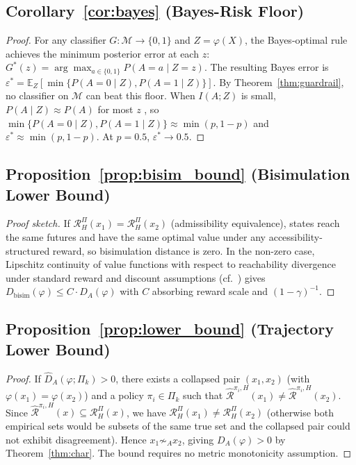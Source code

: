 \documentclass[10pt,twocolumn]{article}
\theoremstyle{plain}
\theoremstyle{definition}
\theoremstyle{remark}
\newcommand{\simA}{\sim_{\!A}}
\newcommand{\RHP}{\mathcal{R}_{H}^{\Pi}}
\newcommand{\DA}{D_{A}(\varphi)}
\newcommand{\calM}{\mathcal{M}}
\begin{document}
\subsection*{Corollary~\ref{cor:bayes} (Bayes-Risk Floor)}

\begin{proof}
For any classifier $G:\calM\to\{0,1\}$ and $Z=\varphi(X)$, the Bayes-optimal
rule achieves the minimum posterior error at each $z$:
$G^*(z)=\arg\max_{a\in\{0,1\}}P(A=a\mid Z=z)$.
The resulting Bayes error is
$\varepsilon^*=\mathbb{E}_Z[\min\{P(A=0\mid Z),P(A=1\mid Z)\}]$.
By Theorem~\ref{thm:guardrail}, no classifier on $\calM$ can beat this floor.
When $I(A;Z)$ is small, $P(A\mid Z)\approx P(A)$ for most $z$
\citep{cover2006elements}, so $\min\{P(A=0\mid Z),P(A=1\mid Z)\}\approx\min(p,1-p)$
and $\varepsilon^*\approx\min(p,1-p)$. At $p=0.5$, $\varepsilon^*\to 0.5$.
\end{proof}

\subsection*{Proposition~\ref{prop:bisim_bound} (Bisimulation Lower Bound)}

\begin{proof}[Proof sketch]
If $\RHP(x_1)=\RHP(x_2)$ (admissibility equivalence), states reach the same
futures and have the same optimal value under any accessibility-structured reward,
so bisimulation distance is zero. In the non-zero case, Lipschitz continuity of
value functions with respect to reachability divergence under standard reward and
discount assumptions (cf.\ \citet{ferns2004metrics}) gives
$D_{\mathrm{bisim}}(\varphi)\leq C\cdot\DA$ with $C$ absorbing reward scale
and $(1-\gamma)^{-1}$.
\end{proof}

\subsection*{Proposition~\ref{prop:lower_bound} (Trajectory Lower Bound)}

\begin{proof}
If $\hat{D}_A(\varphi;\Pi_k)>0$, there exists a collapsed pair $(x_1,x_2)$
(with $\varphi(x_1)=\varphi(x_2)$) and a policy $\pi_i\in\Pi_k$ such that
$\hat{\mathcal{R}}^{\pi_i,H}(x_1)\neq\hat{\mathcal{R}}^{\pi_i,H}(x_2)$.
Since $\hat{\mathcal{R}}^{\pi_i,H}(x)\subseteq\RHP(x)$, we have
$\RHP(x_1)\neq\RHP(x_2)$ (otherwise both empirical sets would be subsets of
the same true set and the collapsed pair could not exhibit disagreement). Hence
$x_1\not\simA x_2$, giving $\DA>0$ by Theorem~\ref{thm:char}. The bound
requires no metric monotonicity assumption.
\end{proof}
\end{document}
